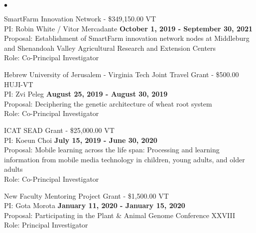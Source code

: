 \documentclass[margin,line,10pt]{res}
\newenvironment{list2}{
  \begin{list}{$\bullet$}{%
      \setlength{\itemsep}{0in}
      \setlength{\parsep}{0in} \setlength{\parskip}{0in}
      \setlength{\topsep}{0in} \setlength{\partopsep}{0in} 
      \setlength{\leftmargin}{0.2in}}}{\end{list}}
\begin{document}
\begin{resume}
\begin{list2}
\vspace{0.5cm}


\item SmartFarm Innovation Network - \$349,150.00  \hfill VT\\
PI: Robin White / Vitor Mercadante  \hfill \textbf{October 1, 2019 - September 30, 2021}\\
Proposal: Establishment of SmartFarm innovation network nodes at Middleburg and Shenandoah Valley Agricultural Research and Extension Centers \\
Role: Co-Principal Investigator \\

\vspace{0.5cm}


\item  Hebrew University of Jerusalem - Virginia Tech Joint Travel Grant - \$500.00  \hfill HUJI-VT\\
PI: Zvi Peleg  \hfill \textbf{August 25, 2019 - August 30, 2019}\\
Proposal: Deciphering the genetic architecture of wheat root system \\
Role: Co-Principal Investigator \\


\vspace{0.5cm}



\item ICAT SEAD Grant - \$25,000.00  \hfill VT\\
PI: Koeun Choi  \hfill \textbf{July 15, 2019 - June 30, 2020}\\
Proposal:  Mobile learning across the life span: Processing and learning information from mobile media technology in children, young adults, and older adults \\
Role: Co-Principal Investigator \\


\vspace{0.5cm}

\item New Faculty Mentoring Project Grant  - \$1,500.00  \hfill VT\\
PI: Gota Morota   \hfill \textbf{January 11, 2020 - January 15, 2020}\\
Proposal: Participating in the Plant \& Animal Genome Conference XXVIII\\
Role: Principal Investigator \\


\vspace{0.5cm}


\end{list2}
\end{resume}
\end{document}
